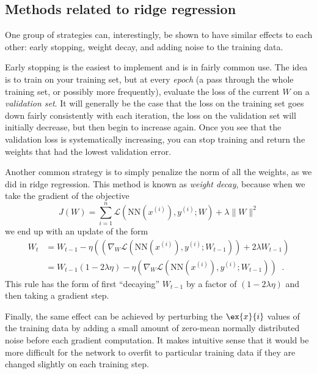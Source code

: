 \subsection{Methods related to ridge regression}

One group of strategies can, interestingly, be shown to have similar
effects to each other: early stopping, weight decay, and adding noise
to the training data. 

Early stopping is the easiest to implement and is in fairly common
use.  The idea is to train on your training set, but at every {\em
    epoch} (a pass through the whole training set, or possibly more
frequently), evaluate the loss of the current $W$ on a {\em validation
    set}.  It will generally be the case that the loss on the training
set goes down fairly consistently with each iteration, the loss on the
validation set will initially decrease, but then begin to increase
again.  Once you see that the validation loss is systematically
increasing, you can stop training and return the weights that had the
lowest validation error.

Another common strategy is to simply penalize the norm of all the
weights, as we did in ridge regression.  This  method is known as {\em
    weight decay}, because when we take the gradient of the objective
$$ J(W) = \sum_{i = 1}^{n}\mathcal{L}(\text{NN}(x^{(i)}), y^{(i)}; W)
  + \lambda\|W\|^2 $$
we end up  with an update of the form
\begin{align*}
  W_t & = W_{t-1} -
  \eta\left(\left(\nabla_{W}\mathcal{L}(\text{NN}(x^{(i)}),
  y^{(i)}; W_{t-1})\right) + 2\lambda W_{t-1}\right)                                      \\
      & = W_{t-1}(1 - 2\lambda\eta) - \eta\left(\nabla_{W}\mathcal{L}(\text{NN}(x^{(i)}),
    y^{(i)}; W_{t-1})\right) \;\;.
\end{align*}
This rule has the form of first ``decaying'' $W_{t-1}$ by a factor of
$(1 - 2 \lambda \eta)$ and then taking a gradient step.

Finally, the same effect can be achieved by perturbing the $\ex{x}{i}$
values of the training data by adding a small amount of zero-mean
normally distributed noise before each gradient computation.  It makes
intuitive sense that it would be more difficult for the network to
overfit to particular training data if they are changed slightly on
each training step.

